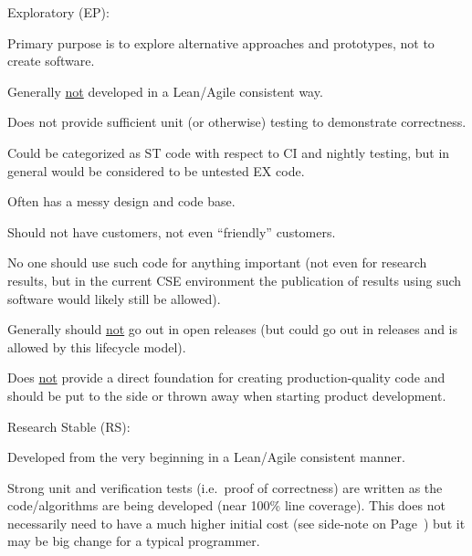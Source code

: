 \documentclass[11pt]{SANDreport}
\begin{document}
\begin{compactenum}

{}\item Exploratory (EP):

\begin{compactitem}

{}\item Primary purpose is to explore alternative approaches and prototypes, not to create software.

{}\item Generally {}\underline{not} developed in a Lean/Agile consistent way.

{}\item Does not provide sufficient unit (or otherwise) testing to demonstrate correctness.

{}\item Could be categorized as ST code with respect to CI and nightly testing, but in general would be considered to be untested EX code.

{}\item Often has a messy design and code base.

{}\item Should not have  customers, not even ``friendly'' customers.

{}\item No one should use such code for anything important (not even for research results, but in the current CSE environment the publication of results using such software would likely still be allowed).

{}\item Generally should {}\underline{not} go out in open releases (but could go out in releases and is allowed by this lifecycle model).

{}\item Does {}\underline{not} provide a direct foundation for creating production-quality code and should be put to the side or thrown away when starting product development.

\end{compactitem}

{}\item Research Stable (RS):

\begin{compactitem}

{}\item Developed from the very beginning in a Lean/Agile consistent
manner.

{}\item Strong unit and verification tests (i.e.\ proof of correctness) are written as the code/algorithms are being developed (near 100\% line coverage).  This does not necessarily need to have a much higher initial cost (see side-note on Page~\pageref{levels_of_unit_testing}) but it may be big change for a typical programmer.


\end{compactitem}
\end{compactenum}
\end{document}
